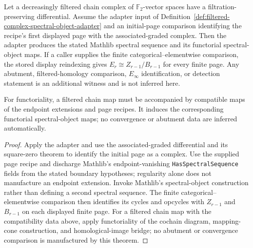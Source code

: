 \begin{theorem}
  \label{thm:filtered-complex-to-spectral-sequence}
  \notready
  Let a decreasingly filtered chain complex of $\mathbb F_2$-vector spaces
  have a filtration-preserving differential.  Assume the adapter input of
  Definition~\ref{def:filtered-complex-spectral-object-adapter} and an
  initial-page comparison identifying the recipe's first displayed page with
  the associated-graded complex.  Then the adapter produces the stated
  Mathlib spectral sequence and its functorial spectral-object maps.  If a
  caller supplies the finite categorical--elementwise comparison, the stored
  display reindexing gives $E_r\cong Z_{r-1}/B_{r-1}$ for every finite page.
  Any abutment, filtered-homology comparison, $E_\infty$ identification, or
  detection statement is an additional witness and is not inferred here.

  For functoriality, a filtered chain map must be accompanied by compatible
  maps of the endpoint extensions and page recipes.  It induces the
  corresponding functorial spectral-object maps; no convergence or abutment
  data are inferred automatically.
\end{theorem}

\begin{proof}
  Apply the adapter and use the associated-graded differential and its
  square-zero theorem to identify the initial page as a complex.  Use the
  supplied page recipe and discharge Mathlib's endpoint-vanishing
  \texttt{HasSpectralSequence} fields from the stated boundary hypotheses;
  regularity alone does not manufacture an endpoint extension.  Invoke
  Mathlib's spectral-object construction rather than defining a second
  spectral sequence.  The finite categorical--elementwise comparison then
  identifies its cycles and opcycles with $Z_{r-1}$ and $B_{r-1}$ on each
  displayed finite page.  For a filtered chain map with the compatibility data
  above, apply functoriality of the cochain diagram, mapping-cone construction,
  and homological-image bridge; no abutment or convergence comparison is
  manufactured by this theorem.
\end{proof}
